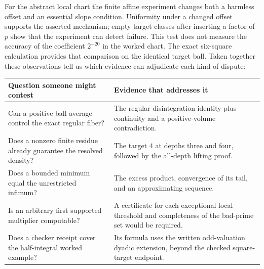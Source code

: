 \documentclass[12pt,letterpaper]{article}
\begin{document}
For the abstract local chart the finite affine experiment changes both a harmless offset and an essential slope condition. Uniformity under a changed offset supports the asserted mechanism; empty target classes after inserting a factor of $p$ show that the experiment can detect failure. This test does not measure the accuracy of the coefficient $2^{-20}$ in the worked chart. The exact six-square calculation provides that comparison on the identical target ball. Taken together these observations tell us which evidence can adjudicate each kind of dispute:
\begin{center}\small
\begin{tabularx}{\linewidth}{@{}YY@{}}\toprule
Question someone might contest & Evidence that addresses it\\\midrule
Can a positive ball average control the exact regular fiber? & The regular disintegration identity plus continuity and a positive-volume contradiction.\\
Does a nonzero finite residue already guarantee the resolved density? & The target $4$ at depths three and four, followed by the all-depth lifting proof.\\
Does a bounded minimum equal the unrestricted infimum? & The excess product, convergence of its tail, and an approximating sequence.\\
Is an arbitrary first supported multiplier computable? & A certificate for each exceptional local threshold and completeness of the bad-prime set would be required.\\
Does a checker receipt cover the half-integral worked example? & Its formula uses the written odd-valuation dyadic extension, beyond the checked square-target endpoint.\\
\bottomrule\end{tabularx}
\end{center}
\end{document}

